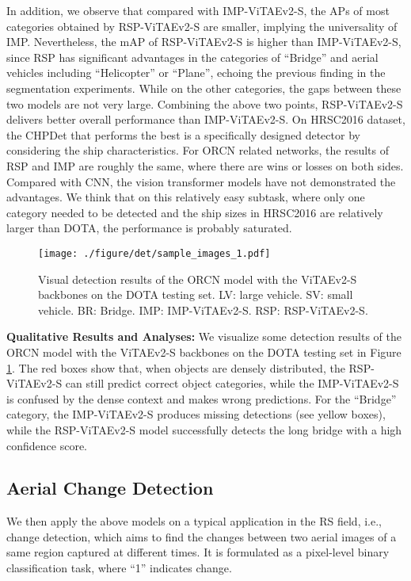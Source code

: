 \documentclass[10pt, journal,twoside]{IEEEtran}
\begin{document}
In addition, we observe that compared with IMP-ViTAEv2-S, the APs of most categories obtained by RSP-ViTAEv2-S are smaller, implying the universality of IMP. Nevertheless, the mAP of RSP-ViTAEv2-S is higher than IMP-ViTAEv2-S, since RSP has significant advantages in the categories of ``Bridge'' and aerial vehicles including ``Helicopter'' or ``Plane'', echoing the previous finding in the segmentation experiments. While on the other categories, the gaps between these two models are not very large. Combining the above two points, RSP-ViTAEv2-S delivers better overall performance than IMP-ViTAEv2-S. On HRSC2016 dataset, the CHPDet \cite{aod_2022_tgrs_chpdet} that performs the best is a specifically designed detector by considering the ship characteristics. For ORCN \cite{orcn} related networks, the results of RSP and IMP are roughly the same, where there are wins or losses on both sides. Compared with CNN, the vision transformer models have not demonstrated the advantages. We think that on this relatively easy subtask, where only one category needed to be detected and the ship sizes in HRSC2016 are relatively larger than DOTA, the performance is probably saturated. 

\begin{figure}[t]
  \centering
  \texttt{[image: ./figure/det/sample\_images\_1.pdf]}
  \caption{Visual detection results of the ORCN model with the ViTAEv2-S backbones on the DOTA testing set. LV: large vehicle. SV: small vehicle. BR: Bridge. IMP: IMP-ViTAEv2-S. RSP: RSP-ViTAEv2-S.}
  \label{det_maps}
\end{figure}

\textbf{Qualitative Results and Analyses:} We visualize some detection results of the ORCN model with the ViTAEv2-S backbones on the DOTA testing set in Figure \ref{det_maps}. The red boxes show that, when objects are densely distributed, the RSP-ViTAEv2-S can still predict correct object categories, while the IMP-ViTAEv2-S is confused by the dense context and makes wrong predictions. For the ``Bridge'' category, the IMP-ViTAEv2-S produces missing detections (see yellow boxes), while the RSP-ViTAEv2-S model successfully detects the long bridge with a high confidence score.

\subsection{Aerial Change Detection}

We then apply the above models on a typical application in the RS field, i.e., change detection, which aims to find the changes between two aerial images of a same region captured at different times. It is formulated as a pixel-level binary classification task, where ``1'' indicates change.
\end{document}
